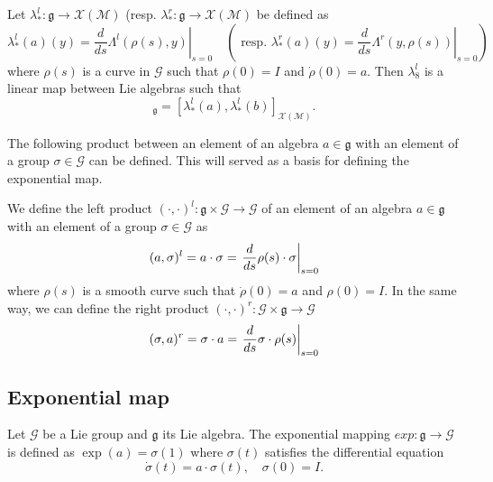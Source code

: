 \begin{lemma}
  Let $\lambda^l_{*} : \mathfrak g \rightarrow \mathcal X(\mathcal M) $ (resp. $\lambda^r_{*} : \mathfrak g \rightarrow \mathcal X(\mathcal M) $ be defined as
  \begin{equation}
  \lambda^l_{*}(a)(y) = \left.\frac{d}{ds}{ \Lambda^l (\rho(s), y)}\right|_{s=0} \quad (\text{ resp. }  \lambda^r_{*}(a)(y) = \left.\frac{d}{ds}{ \Lambda^r (y, \rho(s))}\right|_{s=0})\label{eq:26}
\end{equation}
 where $\rho(s)$ is a curve in $\mathcal G$ such that $\rho(0)=I$ and $\dot\rho (0)=a$. Then $\lambda^l_{8}$ is a linear
map between Lie algebras such that
\begin{equation}
  [a, b]_{\mathfrak g} = [\lambda^l_{*}(a), \lambda^l_{*}(b)]_{\mathcal X(\mathcal M)}.\label{eq:27}
\end{equation}
\end{lemma}


The following product between an element of an algebra $a \in \mathfrak g$ with an element of a group $\sigma  \in \mathcal G$
 can be defined. This will served as a basis for defining the exponential map.
\begin{definition}
  We define the left product $(\cdot, \cdot)^l : \mathfrak g \times \mathcal G \rightarrow  \mathcal G$ of an element of an algebra $a \in \mathfrak g$ with an element of a group $\sigma  \in \mathcal G$ as
  \begin{equation}
 (a, \sigma)^l = a \cdot \sigma = \left.\frac{d}{ds} \rho(s) \cdot \sigma \right|_{s=0}\label{eq:28}
\end{equation}
where $\rho(s)$ is a smooth curve such that $\dot\rho(0)=a$ and $\rho(0)=I$. In the same way, we can define the right product $(\cdot, \cdot)^r : \mathcal G \times \mathfrak g  \rightarrow   \mathcal G$
\begin{equation}
  \label{eq:29}
  (\sigma,a)^r = \sigma \cdot a  = \left.\frac{d}{ds} \sigma \cdot \rho(s)   \right|_{s=0}
\end{equation}
\end{definition}

\subsection{Exponential map}
\begin{definition}
  Let $\mathcal G$ be a Lie group and $\mathfrak g$ its Lie algebra. The exponential mapping $exp : \mathfrak g \rightarrow \mathcal G$ is defined as $\exp(a) = \sigma(1)$ where $\sigma (t)$ satisfies the  differential equation
\begin{equation}
\dot \sigma(t) = a \cdot \sigma(t), \quad \sigma (0) = I.\label{eq:30}
\end{equation}
\end{definition}

